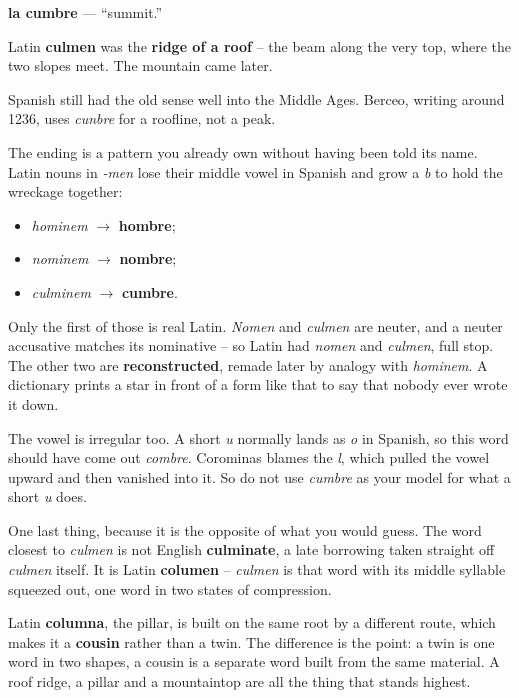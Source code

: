 \begin{cousinweb}
\textbf{la cumbre} — \textquotedblleft{}summit.\textquotedblright{}

Latin \textbf{culmen} was the \textbf{ridge of a roof} -- the beam along the very top, where the two slopes meet. The mountain came later.

Spanish still had the old sense well into the Middle Ages. Berceo, writing around 1236, uses \emph{cunbre} for a roofline, not a peak.

The ending is a pattern you already own without having been told its name. Latin nouns in \emph{-men} lose their middle vowel in Spanish and grow a \emph{b} to hold the wreckage together:

\begin{itemize}
\raggedright
  \item \emph{hominem} $\to$ \textbf{hombre};
  \item \emph{nominem} $\to$ \textbf{nombre};
  \item \emph{culminem} $\to$ \textbf{cumbre}.
\end{itemize}

Only the first of those is real Latin. \emph{Nomen} and \emph{culmen} are neuter, and a neuter accusative matches its nominative -- so Latin had \emph{nomen} and \emph{culmen}, full stop. The other two are \textbf{reconstructed}, remade later by analogy with \emph{hominem}. A dictionary prints a star in front of a form like that to say that nobody ever wrote it down.

The vowel is irregular too. A short \emph{u} normally lands as \emph{o} in Spanish, so this word should have come out \emph{combre}. Corominas blames the \emph{l}, which pulled the vowel upward and then vanished into it. So do not use \emph{cumbre} as your model for what a short \emph{u} does.

One last thing, because it is the opposite of what you would guess. The word closest to \emph{culmen} is not English \textbf{culminate}, a late borrowing taken straight off \emph{culmen} itself. It is Latin \textbf{columen} -- \emph{culmen} is that word with its middle syllable squeezed out, one word in two states of compression.

Latin \textbf{columna}, the pillar, is built on the same root by a different route, which makes it a \textbf{cousin} rather than a twin. The difference is the point: a twin is one word in two shapes, a cousin is a separate word built from the same material. A roof ridge, a pillar and a mountaintop are all the thing that stands highest.
\end{cousinweb}

